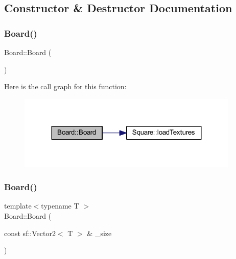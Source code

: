 \subsection{Constructor \& Destructor Documentation}
\mbox{\label{class_board_a9ee491d4fea680cf69b033374a9fdfcb}} 
\subsubsection{\texorpdfstring{Board()}{Board()}\hspace{0.1cm}{\footnotesize\ttfamily [1/3]}}
{\footnotesize\ttfamily Board\+::\+Board (\begin{DoxyParamCaption}{ }\end{DoxyParamCaption})}

Here is the call graph for this function\+:
\nopagebreak
\begin{figure}[H]
\begin{center}
\leavevmode
\includegraphics[width=299pt]{class_board_a9ee491d4fea680cf69b033374a9fdfcb_cgraph}
\end{center}
\end{figure}
\mbox{\label{class_board_a3ab3bc5a15b6f8fb4aa8473fed2afdcb}} 
\subsubsection{\texorpdfstring{Board()}{Board()}\hspace{0.1cm}{\footnotesize\ttfamily [2/3]}}
{\footnotesize\ttfamily template$<$typename T $>$ \\
Board\+::\+Board (\begin{DoxyParamCaption}\item[{const sf\+::\+Vector2$<$ T $>$ \&}]{\+\_\+size }\end{DoxyParamCaption})}

